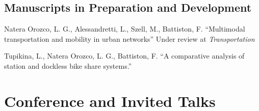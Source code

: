 \documentclass{academiccv}
\begin{document}
\subsection*{Manuscripts in Preparation and Development}
\begin{tablist}
	\item[\the\year] \tab Natera Orozco, L. G., Alessandretti, L., Szell, M., Battiston, F. \enquote{Multimodal transportation and mobility in urban networks} Under review at \textit{Transportation}
	\item[\the\year] \tab Tupikina, L., Natera Orozco, L. G., Battiston, F. \enquote{A comparative analysis of station and dockless bike share systems.} 
\end{tablist}

\section*{Conference and Invited Talks}
\end{document}
